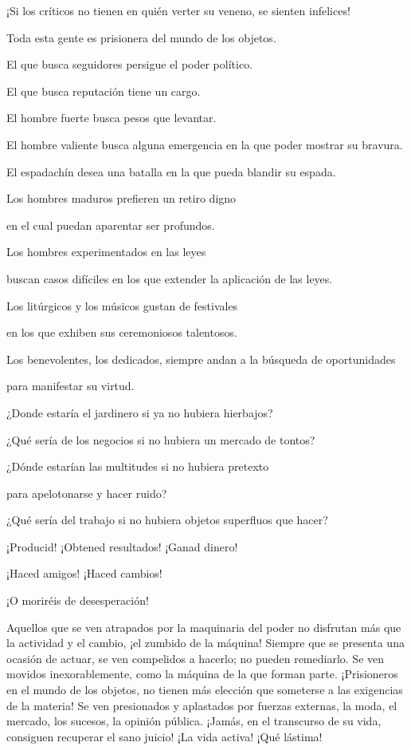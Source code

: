 ¡Si los críticos no tienen en quién verter su veneno, se sienten
infelices!

Toda esta gente es prisionera del mundo de los objetos.

El que busca seguidores persigue el poder político.

El que busca reputación tiene un cargo.

El hombre fuerte busca pesos que levantar.

El hombre valiente busca alguna emergencia en la que poder mostrar su
bravura.

El espadachín desea una batalla en la que pueda blandir su espada.

Los hombres maduros prefieren un retiro digno

en el cual puedan aparentar ser profundos.

Los hombres experimentados en las leyes

buscan casos difíciles en los que extender la aplicación de las leyes.

Los litúrgicos y los músicos gustan de festivales

en los que exhiben sus ceremoniosos talentosos.

Los benevolentes, los dedicados, siempre andan a la búsqueda de
oportunidades

para manifestar su virtud.

¿Donde estaría el jardinero si ya no hubiera hierbajos?

¿Qué sería de los negocios si no hubiera un mercado de tontos?

¿Dónde estarían las multitudes si no hubiera pretexto

para apelotonarse y hacer ruido?

¿Qué sería del trabajo si no hubiera objetos superfluos que hacer?

¡Producid! ¡Obtened resultados! ¡Ganad dinero!

¡Haced amigos! ¡Haced cambios!

¡O moriréis de desesperación!

Aquellos que se ven atrapados por la maquinaria del poder no disfrutan
más que la actividad y el cambio, ¡el zumbido de la máquina! Siempre que
se presenta una ocasión de actuar, se ven compelidos a hacerlo; no
pueden remediarlo. Se ven movidos inexorablemente, como la máquina de la
que forman parte. ¡Prisioneros en el mundo de los objetos, no tienen más
elección que someterse a las exigencias de la materia! Se ven
presionados y aplastados por fuerzas externas, la moda, el mercado, los
sucesos, la opinión pública. ¡Jamás, en el transcurso de su vida,
consiguen recuperar el sano juicio! ¡La vida activa! ¡Qué lástima!

